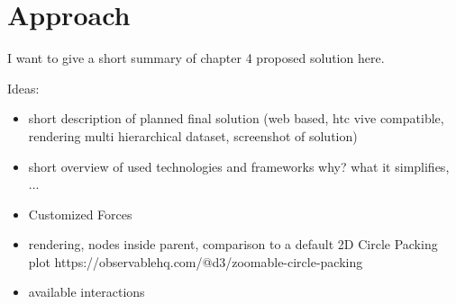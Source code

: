 \section{Approach}

I want to give a short summary of chapter 4 proposed solution here. 

Ideas:
\begin{itemize}
    \item short description of planned final solution (web based, htc vive compatible, rendering multi hierarchical dataset, screenshot of solution)  
    \item short overview of used technologies and frameworks why? what it simplifies, ... 
    \item Customized Forces
    \item rendering, nodes inside parent, comparison to a default 2D Circle Packing plot https://observablehq.com/@d3/zoomable-circle-packing 
    \item available interactions
\end{itemize}